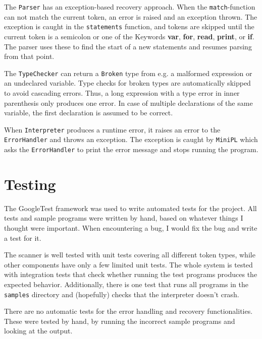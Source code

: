 \documentclass[a4paper]{article}
\newcommand*{\code}[1]{\texttt{#1}}
\begin{document}
The \code{Parser} has an exception-based recovery approach. When the 
\code{match}-function can not match the current token, an error 
is raised and an exception thrown. The exception is caught 
in the \code{statements} function, and tokens are skipped until
the current token is a semicolon or one of the Keywords 
\textbf{var}, \textbf{for}, \textbf{read}, \textbf{print}, 
or \textbf{if}. The parser uses these to find the start of a 
new statements and resumes parsing from that point.


The \code{TypeChecker} can return a \code{Broken} type from e.g.
a malformed expression or an undeclared variable. Type checks 
for broken types are automatically skipped to avoid cascading 
errors. Thus, a long expression with a type error in inner 
parenthesis only produces one error. In case of multiple 
declarations of the same variable, the first declaration is 
assumed to be correct.

When \code{Interpreter} produces a runtime error, it 
raises an error to the \code{ErrorHandler} and throws an exception. 
The exception is caught by \code{MiniPL} which asks the 
\code{ErrorHandler} to print the error message and stops running the 
program.

\section{Testing}

The GoogleTest framework was used to write automated 
tests for the project. All tests and sample programs were written 
by hand, based on whatever 
things I thought were important. When encountering a bug, I would 
fix the bug and write a test for it. 


The scanner is well tested with unit tests 
covering all different token types, while other components have 
only a few limited unit tests. The whole system is tested with 
integration tests that check whether running the test programs 
produces the expected behavior. Additionally, there is one 
test that runs all programs in the \code{samples} directory 
and (hopefully) checks that the interpreter doesn't crash.

There are no automatic tests for the error handling and recovery 
functionalities. These were tested by hand, by running the incorrect 
sample programs and looking at the output.
\clearpage
\appendix
  
\newcommand{\pdfappendix}[2]{%

}


\end{document}

